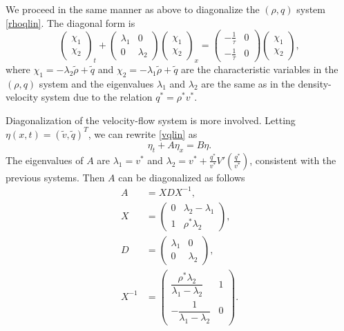 \documentclass[preprint]{elsarticle}
\begin{document}
We proceed in the same manner as above to diagonalize the $(\rho,q)$ system \eqref{rhoqlin}. The diagonal form is
\begin{equation} \label{rhoqlindiag}
\begin{pmatrix}
\chi_1 \\ \chi_2
\end{pmatrix}_t 
+ \begin{pmatrix}
\lambda_1 & 0 \\
0 & \lambda_2
\end{pmatrix}
\begin{pmatrix}
\chi_1 \\ \chi_2
\end{pmatrix}_x
= \begin{pmatrix}
-\frac{1}{\tau} & 0 \\
-\frac{1}{\tau} & 0
\end{pmatrix}
\begin{pmatrix}
\chi_1 \\ \chi_2
\end{pmatrix},
\end{equation}
where $\chi_1 = -\lambda_2 \tilde{\rho} + \tilde{q}$ and $\chi_2 = -\lambda_1 \tilde{\rho} + \tilde{q}$ are the characteristic variables in the $(\rho,q)$ system and the eigenvalues $\lambda_1$ and $\lambda_2$ are the same as in the density-velocity system due to the relation $q^* = \rho^*v^*$. 

Diagonalization of the velocity-flow system is more involved. Letting $\eta(x,t) = (\tilde{v}, \tilde{q})^T$, we can rewrite \eqref{vqlin} as
\begin{equation} \label{vqlinxi}
\eta_t + A\eta_x = B\eta.
\end{equation}
The eigenvalues of $A$ are $\lambda_1 = v^*$ and $\lambda_2 = v^* + \frac{q^*}{v^*} V'\left(\frac{q^*}{v^*}\right)$, consistent with the previous systems. Then $A$ can be diagonalized as follows
\begin{align}
A &= XDX^{-1}, \\
X &= \begin{pmatrix}
0 & \lambda_2-\lambda_1 \\
1 & \rho^*\lambda_2
\end{pmatrix}, \\
D &= \begin{pmatrix}
\lambda_1 & 0 \\
0 & \lambda_2
\end{pmatrix},\\
X^{-1} &= \begin{pmatrix}
\dfrac{\rho^*\lambda_2}{\lambda_1 - \lambda_2} & 1 \\
-\dfrac{1}{\lambda_1 - \lambda_2} & 0
\end{pmatrix}.
\end{align}
\end{document}
